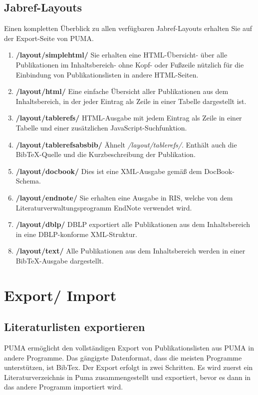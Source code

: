 \documentclass[a4paper,11pt,twoside]{scrbook}
\begin{document}
\subsection{Jabref-Layouts}
Einen kompletten Überblick zu allen verfügbaren Jabref-Layouts erhalten Sie auf der Export-Seite von PUMA.
\begin{enumerate}
	\item  \textbf{/layout/simplehtml/}\newline
	Sie erhalten eine HTML-Übersicht- über alle Publikationen im 		Inhaltsbereich- ohne Kopf- oder Fußzeile nützlich für die 			Einbindung von Publikationslisten in andere HTML-Seiten.
	\item \textbf{/layout/html/}\newline
    Eine einfache Übersicht aller Publikationen aus dem Inhaltsbereich, in der jeder Eintrag als Zeile in einer Tabelle dargestellt ist.
	\item \textbf{/layout/tablerefs/} \newline
    HTML-Ausgabe mit jedem Eintrag als Zeile in einer Tabelle und einer zusätzlichen JavaScript-Suchfunktion.
\item \textbf{/layout/tablerefsabsbib/} \newline
    Ähnelt \textit{/layout/tablerefs/}. Enthält auch die BibTeX-Quelle und die Kurzbeschreibung der Publikation.
\item \textbf{/layout/docbook/} \newline
    Dies ist eine XML-Ausgabe gemäß dem DocBook-Schema.
\item \textbf{/layout/endnote/} \newline
    Sie erhalten eine Ausgabe in RIS, welche von dem Literaturverwaltungsprogramm EndNote verwendet wird.
\item \textbf{/layout/dblp/} \newline
    DBLP exportiert alle Publikationen aus dem Inhaltsbereich in eine DBLP-konforme XML-Struktur. 
\item \textbf{/layout/text/}\newline
    Alle Publikationen aus dem Inhaltsbereich werden in einer BibTeX-Ausgabe dargestellt.
\end{enumerate}

\newpage
\section{Export/ Import}
\subsection{Literaturlisten exportieren}
PUMA ermöglicht den vollständigen Export von Publikationslisten aus PUMA in andere Programme. Das gängigste Datenformat, dass die meisten Programme unterstützen, ist BibTex. \newline 
Der Export erfolgt in zwei Schritten. Es wird zuerst ein Literaturverzeichnis in Puma zusammengestellt und exportiert, bevor es dann in das andere Programm importiert wird.
\end{document}
